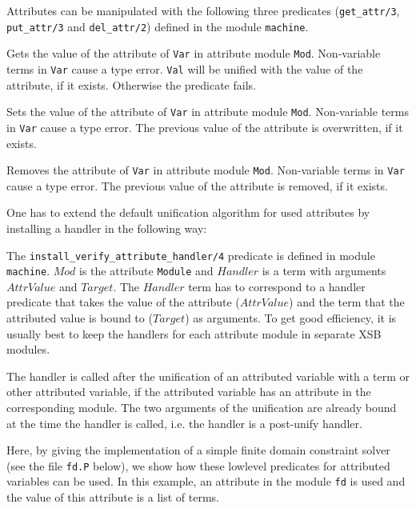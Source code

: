 Attributes can be manipulated with the following three predicates
(\texttt{get\_attr/3}, \texttt{put\_attr/3} and \texttt{del\_attr/2})
defined in the module \texttt{machine}.

\begin{description}
%
Gets the value of the attribute of \texttt{Var} in attribute module
\texttt{Mod}. Non-variable terms in \texttt{Var} cause a type
error. \texttt{Val} will be unified with the value of the attribute,
if it exists. Otherwise the predicate fails.

%
Sets the value of the attribute of \texttt{Var} in attribute module
\texttt{Mod}. Non-variable terms in \texttt{Var} cause a type
error. The previous value of the attribute is overwritten, if it
exists.

%
Removes the attribute of \texttt{Var} in attribute module
\texttt{Mod}. Non-variable terms in \texttt{Var} cause a type
error. The previous value of the attribute is removed, if it exists.
\end{description}

One has to extend the default unification algorithm for used
attributes by installing a handler in the following way:


\noindent The
\texttt{install\_verify\_attribute\_handler/4}
predicate is defined in module \texttt{machine}. $Mod$ is the
attribute {\tt Module} and $Handler$ is a term with arguments
$AttrValue$ and $Target$. The $Handler$ term has to correspond to a
handler predicate that takes the value of the attribute ($AttrValue$)
and the term that the attributed value is bound to ($Target$) as
arguments.  To get good efficiency, it is usually best to keep the
handlers for each attribute module in separate XSB modules.

The handler is called after the unification of an attributed variable
with a term or other attributed variable, if the attributed variable
has an attribute in the corresponding module. The two arguments of the
unification are already bound at the time the handler is called,
i.e. the handler is a post-unify handler.

Here, by giving the implementation of a simple finite domain
constraint solver (see the file \texttt{fd.P} below), we show how
these lowlevel predicates for attributed variables can be used.  In
this example, an attribute in the module \texttt{fd} is used and the
value of this attribute is a list of terms.

